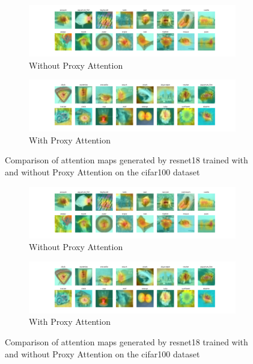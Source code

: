     \begin{figure}[H]
        \centering
        \begin{subfigure}[b]{1\textwidth}
            \includegraphics[width=\textwidth]{images/cifar100_resnet18_noproxy_0.pdf}
            \caption{Without Proxy Attention}
        \end{subfigure}
        \hfill
        \begin{subfigure}[b]{1\textwidth}
            \includegraphics[width=\textwidth]{images/cifar100_resnet18_proxy_0.pdf}
            \caption{With Proxy Attention}
        \end{subfigure}
        \caption{Comparison of attention maps generated by resnet18 trained with and without Proxy Attention on the cifar100 dataset}
    \end{figure}
    

    \begin{figure}[H]
        \centering
        \begin{subfigure}[b]{1\textwidth}
            \includegraphics[width=\textwidth]{images/cifar100_resnet18_noproxy_0.pdf}
            \caption{Without Proxy Attention}
        \end{subfigure}
        \hfill
        \begin{subfigure}[b]{1\textwidth}
            \includegraphics[width=\textwidth]{images/cifar100_resnet18_proxy_0.pdf}
            \caption{With Proxy Attention}
        \end{subfigure}
        \caption{Comparison of attention maps generated by resnet18 trained with and without Proxy Attention on the cifar100 dataset}
    \end{figure}
    
